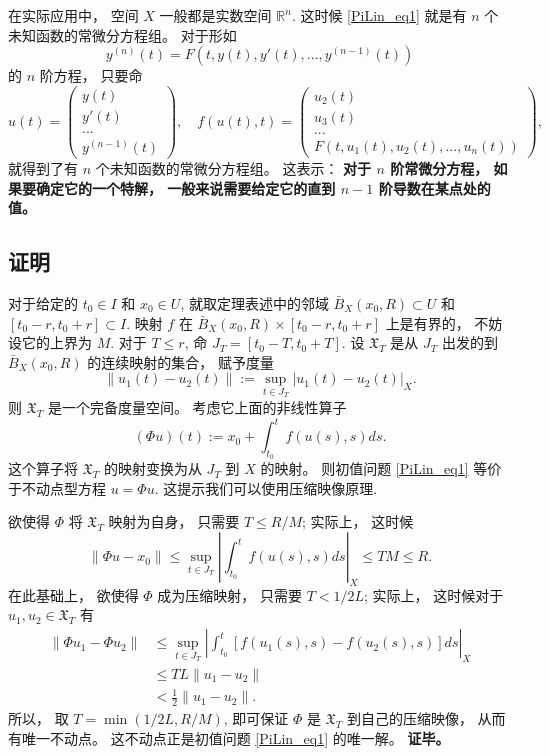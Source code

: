 在实际应用中， 空间 $X$ 一般都是实数空间 $\mathbb{R}^n$. 这时候 \autoref{PiLin_eq1} 就是有 $n$ 个未知函数的常微分方程组。 对于形如
$$
y^{(n)}(t)=F(t,y(t),y'(t),...,y^{(n-1)}(t))
$$
的 $n$ 阶方程， 只要命
$$
u(t)=\left(\begin{array}{c}
y(t)\\
y'(t)\\
...\\
y^{(n-1)}(t)
\end{array}
\right),\quad
f(u(t),t)=\left(\begin{array}{c}
u_2(t)\\
u_3(t)\\
...\\
F\left(t,u_1(t),u_2(t),...,u_n(t)\right)
\end{array}
\right),
$$
就得到了有 $n$ 个未知函数的常微分方程组。 这表示： \textbf{对于 $n$ 阶常微分方程， 如果要确定它的一个特解， 一般来说需要给定它的直到 $n-1$ 阶导数在某点处的值。}

\subsection{证明}
对于给定的 $t_0\in I$ 和 $x_0\in U$, 就取定理表述中的邻域 $\bar B_X(x_0,R)\subset U$ 和 $[t_0-r,t_0+r]\subset I$. 映射 $f$ 在 $\bar B_X(x_0,R)\times[t_0-r,t_0+r]$ 上是有界的， 不妨设它的上界为 $M$. 对于 $T\leq r$, 命 $J_T=[t_0-T,t_0+T]$. 设 $\mathfrak{X}_T$ 是从 $J_T$ 出发的到 $\bar B_X(x_0,R)$ 的连续映射的集合， 赋予度量
$$
\|u_1(t)-u_2(t)\|:=\sup_{t\in J_T}|u_1(t)-u_2(t)|_X.
$$
则 $\mathfrak{X}_T$ 是一个完备度量空间。 考虑它上面的非线性算子
$$
(\Phi u)(t):=x_0+\int_{t_0}^tf(u(s),s)ds.
$$ 
这个算子将 $\mathfrak{X}_T$ 的映射变换为从 $J_T$ 到 $X$ 的映射。 则初值问题 \autoref{PiLin_eq1} 等价于不动点型方程 $u=\Phi u$. 这提示我们可以使用压缩映像原理.

欲使得 $\Phi$ 将 $\mathfrak{X}_T$ 映射为自身， 只需要 $T\leq R/M$; 实际上， 这时候
$$
\|\Phi u-x_0\|
\leq\sup_{t\in J_T}\left|\int_{t_0}^tf(u(s),s)ds\right|_X
\leq TM\leq R.
$$
在此基础上， 欲使得 $\Phi$ 成为压缩映射， 只需要 $T<1/2L$; 实际上， 这时候对于 $u_1,u_2\in\mathfrak{X}_T$ 有
$$
\begin{aligned}
\|\Phi u_1-\Phi u_2\|
&\leq\sup_{t\in J_T}\left|\int_{t_0}^t[f(u_1(s),s)-f(u_2(s),s)]ds\right|_X \\
&\leq TL\|u_1-u_2\|\\
&<\frac{1}{2}\|u_1-u_2\|.
\end{aligned}
$$
所以， 取 $T=\min\left(1/2L,R/M\right)$, 即可保证 $\Phi$ 是 $\mathfrak{X}_T$ 到自己的压缩映像， 从而有唯一不动点。 这不动点正是初值问题 \autoref{PiLin_eq1} 的唯一解。 \textbf{证毕。}

